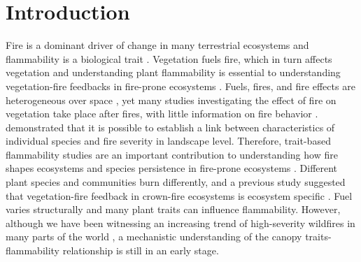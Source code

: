 \documentclass{ttuthes2007}
\begin{document}
\section{Introduction}

Fire is a dominant driver of change in many terrestrial ecosystems and flammability is a biological trait \citep{pausasandmoi2012flammability}. Vegetation fuels fire, which in turn affects vegetation \citep{bova2005linking, jones2006prediction, kavanagh2010way,o2010acute, michaletz2012moving, west2016experimental, lodge2018xylem, bar2019fire}
and understanding plant flammability is essential to understanding vegetation-fire feedbacks in fire-prone ecosystems \citep{pausas2012fire, pausas2017flammability}. Fuels, fires, and fire effects are heterogeneous over space \citep{gagnon2010does}, yet many studies investigating the effect of fire on vegetation take place after fires, with little information on fire behavior \citep{o2018advances}. \citet{schwilk2011scaling} demonstrated that it is possible to establish a link between characteristics of individual species  and fire severity in landscape level. Therefore, trait-based flammability studies are an important contribution to understanding how fire shapes ecosystems and species persistence in fire-prone ecosystems \citep{pausas2012fire, pausas2017flammability}. Different plant species and communities burn differently, and a previous study suggested that vegetation-fire feedback in crown-fire ecosystems is ecosystem specific \citep{pausas2004plant}. Fuel varies structurally and many plant traits can influence flammability. %
However, although we have been witnessing an increasing trend of high-severity wildfires in many parts of the world \citep{miller2012trends, dennison2014large, weber2020spatiotemporal, salguero2020wildfire}, a mechanistic understanding of the canopy traits-flammability relationship is still in an early stage.
\end{document}
